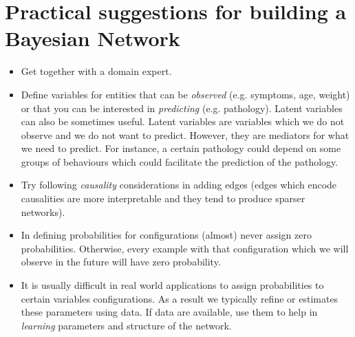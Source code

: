\section{Practical suggestions for building a Bayesian Network}
\label{sec::practicalSuggestions}
\begin{itemize}
    \item Get together with a domain expert.
    
    \item Define variables for entities that can be \textit{observed} (e.g. symptoms, age, weight) or that you can be interested in \textit{predicting} (e.g. pathology). Latent variables can also be sometimes useful. Latent variables are variables which we do not observe and we do not want to predict. However, they are mediators for what we need to predict. For instance, a certain pathology could depend on some groups of behaviours which could facilitate the prediction of the pathology.
    
    \item Try following \textit{causality} considerations in adding edges (edges which encode causalities are more interpretable and they tend to produce sparser networks).
    
    \item In defining probabilities for configurations (almost) never assign zero probabilities. Otherwise, every example with that configuration which we will observe in the future will have zero probability.
    
    \item It is usually difficult in real world applications to assign probabilities to certain variables configurations. As a result we typically refine or estimates these parameters using data. If data are available, use them to help in \textit{learning} parameters and structure of the network.
\end{itemize}